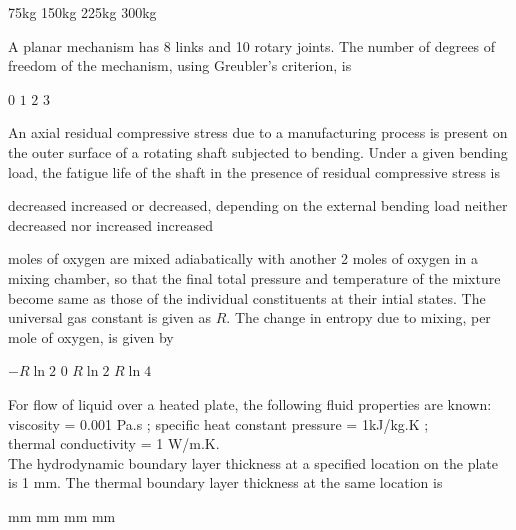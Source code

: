 \documentclass[addpoints,11pt]{exam}
\begin{document}
\begin{questions}
    \begin{oneparchoices}
        \choice 75kg
        \choice 150kg
        \choice 225kg
        \choice 300kg
    \end{oneparchoices}

    \question A planar mechanism has 8 links and 10 rotary joints. The number of degrees of freedom of the mechanism, using Greubler's criterion, is

    \begin{oneparchoices}
        \choice $0$
        \choice $1$
        \choice $2$
        \choice $3$
    \end{oneparchoices}

    \question An axial residual compressive stress due to a manufacturing process is present on the outer surface of a rotating shaft subjected to bending. Under a given bending load, the fatigue life of the shaft in the presence of residual compressive stress is

    \begin{choices}
        \choice decreased
        \choice increased or decreased, depending on the external bending load
        \choice neither decreased nor increased
        \choice increased
    \end{choices}

     moles of oxygen are mixed adiabatically with another 2 moles of oxygen in a mixing chamber, so that the final total pressure and temperature of the mixture become same as those of the individual constituents at their intial states. The universal gas constant is given as $R$. The change in entropy due to mixing, per mole of oxygen, is given by

    \begin{oneparchoices}
        \choice $-R \ln2$
        \choice $0$
        \choice $R \ln 2$
        \choice $R\ln4$
    \end{oneparchoices}

    \question For flow of liquid over a heated plate, the following fluid properties are known:\\
    viscosity = 0.001 Pa.s ; specific heat constant pressure = 1kJ/kg.K ;\\
    thermal conductivity = 1 W/m.K.\\
    The hydrodynamic boundary layer thickness at a specified location on the plate is 1 mm. The thermal boundary layer thickness at the same location is

    \begin{oneparchoices}
         mm
         mm
         mm
         mm
    \end{oneparchoices}


\end{questions}
\end{document}
